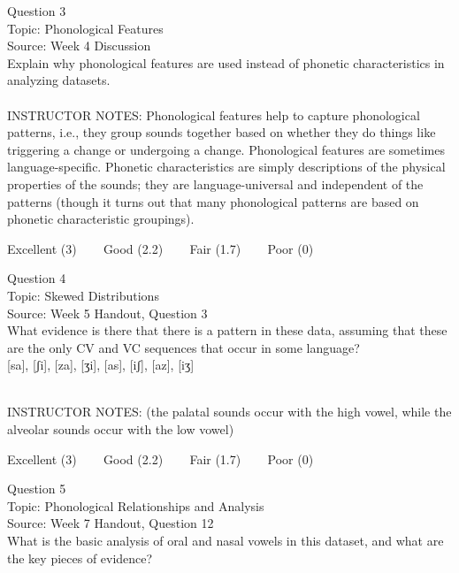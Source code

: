 \documentclass[12pt]{article}
\begin{document}
{\large Question 3}\\

Topic: Phonological Features\\
Source: Week 4 Discussion\\

Explain why phonological features are used instead of phonetic characteristics in analyzing datasets.\\


~\\
INSTRUCTOR NOTES: Phonological features help to capture phonological patterns, i.e., they group sounds together based on whether they do things like triggering a change or undergoing a change. Phonological features are sometimes language-specific. Phonetic characteristics are simply descriptions of the physical properties of the sounds; they are language-universal and independent of the patterns (though it turns out that many phonological patterns are based on phonetic characteristic groupings).


\vfill
Excellent (3) ~~~ Good (2.2) ~~~ Fair (1.7) ~~~ Poor (0)
\newpage

{\large Question 4}\\

Topic: Skewed Distributions\\
Source: Week 5 Handout, Question 3\\

What evidence is there that there is a pattern in these data, assuming that these are the only CV and VC sequences that occur in some language?\\

{[sa]}, {[ʃi]}, {[za]}, {[ʒi]}, {[as]}, {[iʃ]}, {[az]}, {[iʒ]}


~\\
INSTRUCTOR NOTES: (the palatal sounds occur with the high vowel, while the alveolar sounds occur with the low vowel)


\vfill
Excellent (3) ~~~ Good (2.2) ~~~ Fair (1.7) ~~~ Poor (0)
\newpage

{\large Question 5}\\

Topic: Phonological Relationships and Analysis\\
Source: Week 7 Handout, Question 12\\

What is the basic analysis of oral and nasal vowels in this dataset, and what are the key pieces of evidence?\\
\end{document}
